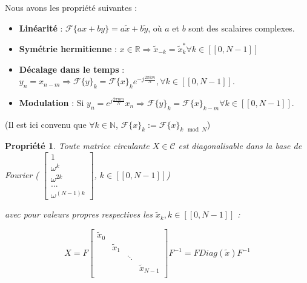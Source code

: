\documentclass[11pt,oneside]{article}
\newtheorem{property}[theorem]{Propriété}
\begin{document}
\begin{tcolorbox}[colback=yellow!10!white,colframe=green!75!black,title=Propriétés de la Transformation de Fourier discrète]

Nous avons les propriété suivantes :

\begin{itemize}
    \item \textbf{Linéarité} : $\mathcal{F}\{a x + b y\} = a \tilde{x} + b \tilde{y}$, où $a$ et $b$ sont des scalaires complexes.
    \item \textbf{Symétrie hermitienne} : $x \in \mathbb{R} \Rightarrow \tilde{x}_{-k} = \tilde{x}_k^* \forall k \in [\![0,N-1]\!]$
    \item \textbf{Décalage dans le temps} :  $y_n = x_{n-m} \Rightarrow \mathcal{F}\{y\}_k = \mathcal{F}\{x\}_k e^{-j \frac{2\pi k m}{N}}, \forall k \in [\![0,N-1]\!]$.
    \item \textbf{Modulation} : Si  $y_n = e^{j \frac{2\pi n m}{N}} x_n \Rightarrow \mathcal{F}\{y\}_k = \mathcal{F}\{x\}_{k-m} \forall k \in [\![0,N-1]\!]$.

\end{itemize}

(Il est ici convenu que $\forall k \in \mathbb{N}$, $\mathcal{F}\{x\}_k := \mathcal{F}\{x\}_{k \mod N}$)

\end{tcolorbox}

    
\begin{property}
Toute matrice circulante $X \in \mathcal{C}$ est diagonalisable dans la base de Fourier (  $\begin{bmatrix}
1 \\
\omega^{k} \\
\omega^{2k}\\
... \\
\omega^{(N-1)k}
\end{bmatrix}$, $k \in [\![0,N-1]\!]$)

avec pour valeurs propres respectives les $\tilde x_k , k \in [\![0,N-1]\!]$ : 

$$X =  F \begin{bmatrix}
    \tilde x_0 &  &  &  \\
      & \tilde x_1 &   &  \\
     &  & \ddots &  \\
     &   &  & \tilde x_{N-1} \\
    \end{bmatrix} F^{-1} = F Diag(\tilde x)F^{-1}$$ 

\end{property}
\end{document}
